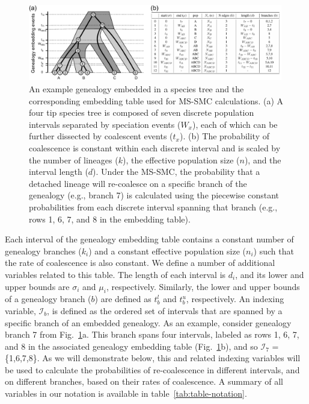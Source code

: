 \documentclass[11pt]{article}
\begin{document}
\begin{figure}[t]
	\centering
	\includegraphics[width=0.99\textwidth]{figures/current/Fig2-embedding-table.pdf}
	\caption{
		An example genealogy embedded in a species tree and the corresponding
		embedding table used for MS-SMC calculations. 
		(a) A four tip species tree is composed of seven discrete population
		intervals separated by speciation events ($W_x$), each of which can be
		further dissected by coalescent events ($t_x$).
		(b) The probability of coalescence is constant within each discrete
		interval and is scaled by the number of lineages ($k$), the effective 
		population size ($n$), and the interval length ($d$).
		Under the MS-SMC, the probability that a detached lineage will re-coalesce
		on a specific branch of the genealogy (e.g., branch 7) is calculated using
		the piecewise constant probabilities from each discrete interval spanning
		that branch (e.g., rows 1, 6, 7, and 8 in the embedding table).
	}
\label{fig:embedding-table}
\end{figure}

Each interval of the genealogy embedding table contains a constant number
of genealogy branches ($k_i$) and a constant effective population size 
($n_i$) such that the rate of coalescence is also constant.
We define a number of additional variables related to this table. 
The length of each interval is $d_i$, and its lower and upper bounds 
are $\sigma_i$ and $\mu_i$, respectively. Similarly, the lower and upper 
bounds of a genealogy branch ($b$) are defined as $t_b^l$ and $t_b^u$, 
respectively. 
An indexing variable, $\mathcal{I}_b$, is defined as the
ordered set of intervals that are spanned by a specific branch
of an embedded genealogy. As an example, consider 
genealogy branch 7 from Fig.~\ref{fig:embedding-table}a.
This branch spans four intervals, 
labeled as rows 1, 6, 7, and 8 in
the associated genealogy embedding table
(Fig.~\ref{fig:embedding-table}b),
and so $\mathcal{I}_7$ = \{1,6,7,8\}. As we will
demonstrate below, this and related indexing variables will be
used to calculate the probabilities of re-coalescence in different
intervals, and on different branches, based on their rates of 
coalescence.
A summary of all variables in our notation is available in 
table~\ref{tab:table-notation}. 
\end{document}

